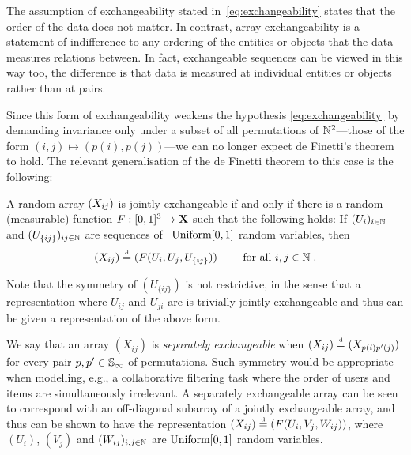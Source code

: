 The assumption of exchangeability stated in~\eqref{eq:exchangeability} states that the order of the data does not matter.
In contrast, array exchangeability is a statement of indifference to any ordering of the entities or objects that the data measures relations between.
In fact, exchangeable sequences can be viewed in this way too, the difference is that data is measured at individual entities or objects rather than at pairs.

Since this form of exchangeability weakens the hypothesis \eqref{eq:exchangeability} by demanding invariance only under a subset of all permutations of $\mathbb{N}^2$---those of the form $(i,j)\mapsto(p(i),p(j))$---we can no longer expect de Finetti's theorem to hold.
The relevant generalisation of the de Finetti theorem to this case is the following:
\begin{thm}
  \label{theorem:ah}
  A random array $(X_{ij})$ is jointly exchangeable if and only if there is a random (measurable) function ${F:[0,1]^3\rightarrow\mathbf{X}}$ such that the following holds: If $(U_i)_{i\in\mathbb{N}}$ and $(U_{\{ij\}})_{ij\in\mathbb{N}}$ are \iid sequences of ~$\mbox{\rm Uniform}[0,1]$ random variables, then
  \begin{equation}
    \label{eq:ah}
    (X_{ij})\stackrel{\mbox{\tiny d}}{=} (F(U_i,U_j,U_{\{ij\}})) \qquad\text{ for all }i,j\in\mathbb{N}\;.
  \end{equation}
\end{thm}

\begin{rem}%
\label{rem:U_ij}
Note that the symmetry of $(U_{\{ij\}})$ is not restrictive, in the sense that a representation where \eg $U_{ij}$ and $U_{ji}$ are \iid is trivially jointly exchangeable and thus can be given a representation of the above form.
\end{rem}
\begin{rem}\label{remsep}
We say that an array $(X_{ij})$ is \emph{separately exchangeable} when $(X_{ij}) \stackrel{\mbox{\tiny d}}{=} (X_{p(i)p'(j)})$ for every pair $p,p' \in \mathbb{S}_{\infty}$ of permutations. 
Such symmetry would be appropriate when modelling, e.g., a collaborative filtering task where the order of users and items are simultaneously irrelevant.
A separately exchangeable array can be seen to correspond with an off-diagonal subarray of a jointly exchangeable array, and thus can be shown to have the representation $(X_{ij}) \stackrel{\mbox{\tiny d}}{=} (F(U_i,V_j,W_{ij}))$, where $(U_i)$, $(V_j)$ and $(W_{ij})_{i,j\in\mathbb{N}}$ are \iid $\mbox{\rm Uniform}[0,1]$ random variables.
\end{rem}

